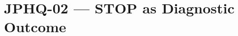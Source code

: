 ﻿%

\ARFreezePaginationBegin

\chapter{JPHQ-02 — STOP as Diagnostic Outcome}
\ARResetCounters










\ARFreezePaginationEnd
\ARNamespaceEnd
